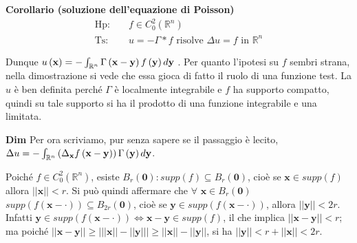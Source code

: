 \documentclass{article}
\begin{document}
\textbf{Corollario (soluzione dell'equazione di Poisson)}%
\begin{eqnarray*}
\text{Hp}\text{: } &&f\in C_{0}^{2}\left( 
\mathbb{R}
^{n}\right) \\
\text{Ts}\text{: } &&u=-\Gamma \ast f\text{ risolve }\Delta u=f\text{ in }%
\mathbb{R}
^{n}
\end{eqnarray*}

Dunque $u\left( \mathbf{x}\right) =-\int_{%
\mathbb{R}
^{n}}\Gamma \left( \mathbf{x-y}\right) f\left( \mathbf{y}\right) d\mathbf{y}$%
. Per quanto l'ipotesi su $f$ sembri strana, nella dimostrazione si vede che
essa gioca di fatto il ruolo di una funzione test. La $u$ \`{e} ben definita
perch\'{e} $\Gamma $ \`{e} localmente integrabile e $f$ ha supporto
compatto, quindi su tale supporto si ha il prodotto di una funzione
integrabile e una limitata.

\textbf{Dim} Per ora scriviamo, pur senza sapere se il passaggio \`{e}
lecito, $\Delta u=-\int_{%
\mathbb{R}
^{n}}\left( \Delta _{\mathbf{x}}f\left( \mathbf{x-y}\right) \right) \Gamma
\left( \mathbf{y}\right) d\mathbf{y}$.

Poich\'{e} $f\in C_{0}^{2}\left( 
\mathbb{R}
^{n}\right) $, esiste $B_{r}\left( \mathbf{0}\right) :supp\left( f\right)
\subseteq B_{r}\left( \mathbf{0}\right) $, cio\`{e} se $\mathbf{x}\in
supp\left( f\right) $ allora $\left\vert \left\vert \mathbf{x}\right\vert
\right\vert <r$. Si pu\`{o} quindi affermare che $\forall $ $\mathbf{x}\in
B_{r}\left( \mathbf{0}\right) $ $supp\left( f\left( \mathbf{x}-\cdot \right)
\right) \subseteq B_{2r}\left( \mathbf{0}\right) $, cio\`{e} se $\mathbf{y}%
\in supp\left( f\left( \mathbf{x}-\cdot \right) \right) $, allora $%
\left\vert \left\vert \mathbf{y}\right\vert \right\vert <2r$. Infatti $%
\mathbf{y}\in supp\left( f\left( \mathbf{x}-\cdot \right) \right)
\Longleftrightarrow \mathbf{x-y}\in supp\left( f\right) $, il che implica $%
\left\vert \left\vert \mathbf{x-y}\right\vert \right\vert <r$; ma poich\'{e} 
$\left\vert \left\vert \mathbf{x-y}\right\vert \right\vert \geq \left\vert
\left\vert \left\vert \mathbf{x}\right\vert \right\vert -\left\vert
\left\vert \mathbf{y}\right\vert \right\vert \right\vert \geq \left\vert
\left\vert \mathbf{x}\right\vert \right\vert -\left\vert \left\vert \mathbf{y%
}\right\vert \right\vert $, si ha $\left\vert \left\vert \mathbf{y}%
\right\vert \right\vert <r+\left\vert \left\vert \mathbf{x}\right\vert
\right\vert <2r$.
\end{document}
